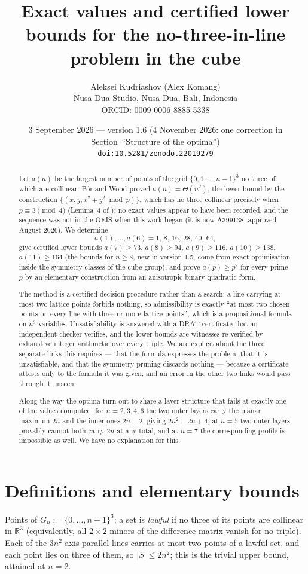 \documentclass[11pt,a4paper]{article}
\title{Exact values and certified lower bounds for the no-three-in-line problem in the cube}
\author{Aleksei Kudriashov (Alex Komang)\\ \small Nusa Dua Studio, Nusa Dua, Bali, Indonesia\\ \small ORCID: 0009-0006-8885-5338}
\date{3 September 2026 --- version 1.6 (4 November 2026: one correction in Section~``Structure of the optima'')\\ \small\texttt{doi:10.5281/zenodo.22019279}}
\begin{document}
\maketitle
\begin{abstract}
Let $a(n)$ be the largest number of points of the grid $\{0,1,\dots,n-1\}^3$ no three of which are collinear.
P\'or and Wood proved $a(n)=\Theta(n^2)$, the lower bound by the construction
$\{(x,y,x^2+y^2\bmod p)\}$, which has no three collinear precisely when $p\equiv3\pmod4$
(Lemma~4 of \cite{PorWood}); no exact values appear to have been recorded, and the sequence was not in
the OEIS when this work began (it is now A399138, approved August 2026).  We determine
\[a(1),\dots,a(6)=1,\,8,\,16,\,28,\,40,\,64,\]
give certified lower bounds $a(7)\ge73$, $a(8)\ge94$, $a(9)\ge116$, $a(10)\ge138$, $a(11)\ge164$ (the bounds for $n\ge8$,
new in version 1.5, come from exact optimisation inside the symmetry classes of the cube group), and prove $a(p)\ge p^2$ for every prime $p$ by an
elementary construction from an anisotropic binary quadratic form.

The method is a certified decision procedure rather than a search: a line carrying at most two lattice points
forbids nothing, so admissibility is exactly ``at most two chosen points on every line with three or more
lattice points'', which is a propositional formula on $n^3$ variables.  Unsatisfiability is answered with a
DRAT certificate that an independent checker verifies, and the lower bounds are witnesses re-verified by
exhaustive integer arithmetic over every triple.  We are explicit about the three separate links this
requires --- that the formula expresses the problem, that it is unsatisfiable, and that the symmetry pruning
discards nothing --- because a certificate attests only to the formula it was given, and an error in the other
two links would pass through it unseen.

Along the way the optima turn out to share a layer structure that fails at exactly one of the values computed:
for $n=2,3,4,6$ the two outer layers carry the planar maximum $2n$ and the inner ones $2n-2$, giving
$2n^2-2n+4$; at $n=5$ two outer layers provably cannot both carry $2n$ at any total, and at $n=7$ the
corresponding profile is impossible as well.  We have no explanation for this.
\end{abstract}

\section{Definitions and elementary bounds}
Points of $G_n:=\{0,\dots,n-1\}^3$; a set is \emph{lawful} if no three of its points are collinear in
$\mathbb R^3$ (equivalently, all $2\times2$ minors of the difference matrix vanish for no triple).
Each of the $3n^2$ axis-parallel lines carries at most two points of a lawful set, and each point lies on
three of them, so $|S|\le 2n^2$; this is the trivial upper bound, attained at $n=2$.
\end{document}
